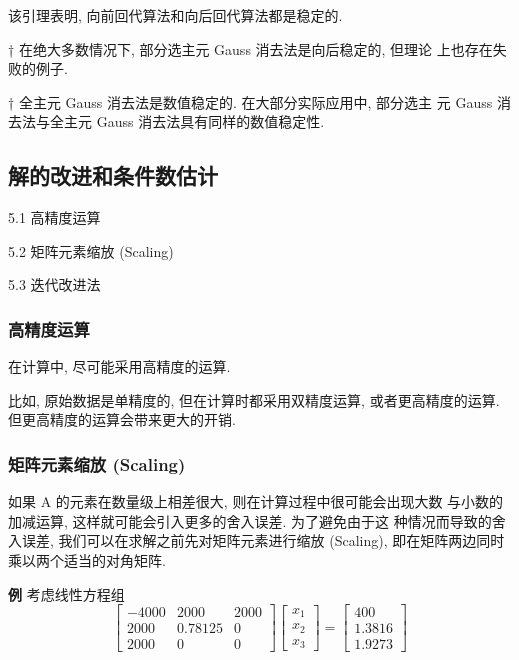 \documentclass[12pt,a4paper]{article}
\begin{document}
该引理表明, 向前回代算法和向后回代算法都是稳定的.


† 在绝大多数情况下, 部分选主元 Gauss 消去法是向后稳定的, 但理论
上也存在失败的例子.



† 全主元 Gauss 消去法是数值稳定的. 在大部分实际应用中, 部分选主
元 Gauss 消去法与全主元 Gauss 消去法具有同样的数值稳定性.


\subsection{解的改进和条件数估计}

5.1 高精度运算

5.2 矩阵元素缩放 (Scaling)

5.3 迭代改进法

\subsubsection{高精度运算}
在计算中, 尽可能采用高精度的运算.

比如, 原始数据是单精度的, 但在计算时都采用双精度运算, 或者更高精度的运算. 但更高精度的运算会带来更大的开销.

\subsubsection{矩阵元素缩放 (Scaling)}
如果 A 的元素在数量级上相差很大, 则在计算过程中很可能会出现大数
与小数的加减运算, 这样就可能会引入更多的舍入误差. 为了避免由于这
种情况而导致的舍入误差, 我们可以在求解之前先对矩阵元素进行缩放
(Scaling), 即在矩阵两边同时乘以两个适当的对角矩阵.


{\bfseries 例} 考虑线性方程组
\begin{equation}
\left[\begin{array}{ccc}{-4000} & {2000} & {2000} \\ {2000} & {0.78125} & {0} \\ {2000} & {0} & {0}\end{array}\right]\left[\begin{array}{l}{x_{1}} \\ {x_{2}} \\ {x_{3}}\end{array}\right]=\left[\begin{array}{c}{400} \\ {1.3816} \\ {1.9273}\end{array}\right]
\end{equation}
\end{document}
